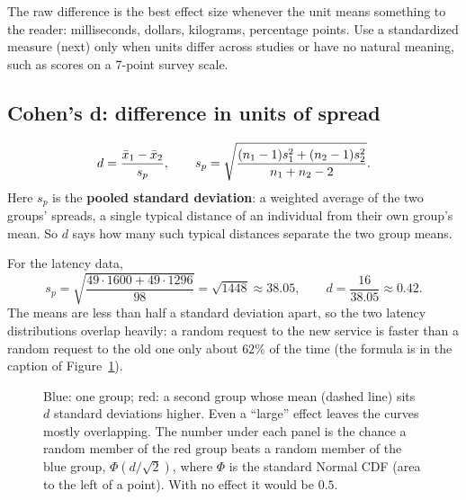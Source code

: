 \begin{intuitionbox}
The raw difference is the best effect size whenever the unit means something to
the reader: milliseconds, dollars, kilograms, percentage points. Use a
standardized measure (next) only when units differ across studies or have no
natural meaning, such as scores on a 7-point survey scale.
\end{intuitionbox}

\subsection{Cohen's d: difference in units of spread}

\begin{definition}[Cohen's $d$]
\[
  d = \frac{\bar{x}_1-\bar{x}_2}{s_p},
  \qquad
  s_p = \sqrt{\frac{(n_1-1)s_1^2+(n_2-1)s_2^2}{n_1+n_2-2}}.
\]
Here $s_p$ is the \textbf{pooled standard deviation}: a weighted average of the two
groups' spreads, a single typical distance of an individual from their own group's
mean. So $d$ says how many such typical distances separate the two group means.
\end{definition}

For the latency data,
\[
  s_p=\sqrt{\frac{49\cdot 1600+49\cdot 1296}{98}}=\sqrt{1448}\approx 38.05,
  \qquad d=\frac{16}{38.05}\approx 0.42.
\]
The means are less than half a standard deviation apart, so the two latency
distributions overlap heavily: a random request to the new service is faster than a
random request to the old one only about $62\%$ of the time (the formula is in the
caption of Figure~\ref{fig:pitfalls-cohen}).

\begin{figure}[H]
\centering
{}
\caption{Blue: one group; red: a second group whose mean (dashed line) sits $d$
standard deviations higher. Even a ``large'' effect leaves the curves mostly
overlapping. The number under each panel is the chance a random member of the red
group beats a random member of the blue group, $\Phi(d/\sqrt 2)$, where $\Phi$ is the standard
Normal CDF (area to the left of a point). With no effect it would be $0.5$.}
\label{fig:pitfalls-cohen}
\end{figure}

